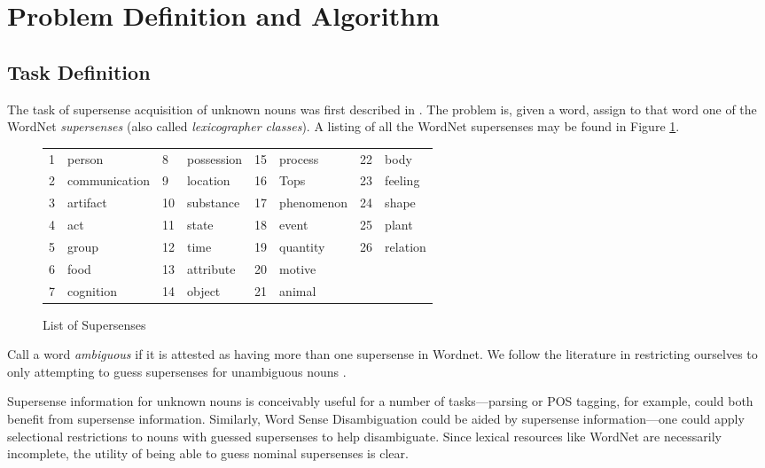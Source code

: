 \documentclass{article}
\begin{document}
\section{Problem Definition and Algorithm}

\subsection{Task Definition}


The task of supersense acquisition of unknown nouns was first described in \cite{cj}.
The problem is, given a word,  assign to that word one of the WordNet {\it supersenses} (also called {\it lexicographer classes}).
A listing of all the WordNet supersenses may be found in Figure \ref{fig:supersenses}.
\begin{center}
\begin{figure}[hbtp]
\begin{tabular}{llllllll}
1& person & 8& possession&  15& process&  22& body \\
2& communication & 9& location& 16& Tops&  23& feeling \\
3& artifact & 10& substance&  17& phenomenon& 24& shape \\
4& act & 11& state& 18& event&  25& plant \\
5& group & 12& time& 19& quantity&  26& relation \\
6& food & 13&  attribute& 20& motive \\
7& cognition& 14& object& 21& animal \\
\end{tabular}
\caption{List of Supersenses}
\label{fig:supersenses}
\end{figure}
\end{center}

Call a word {\it ambiguous} if it is attested as having more than one supersense in Wordnet.
We follow the literature in restricting ourselves to only attempting to guess supersenses for unambiguous nouns \cite{cj}\cite{curran}.

Supersense information for unknown nouns is conceivably useful for a number of tasks---parsing or POS tagging, for example, could both benefit from supersense information.
Similarly, Word Sense Disambiguation could be aided by supersense information---one could apply selectional restrictions to nouns with guessed supersenses to help disambiguate.
Since lexical resources like WordNet are necessarily incomplete, the utility of being able to guess nominal supersenses is clear.
\end{document}
